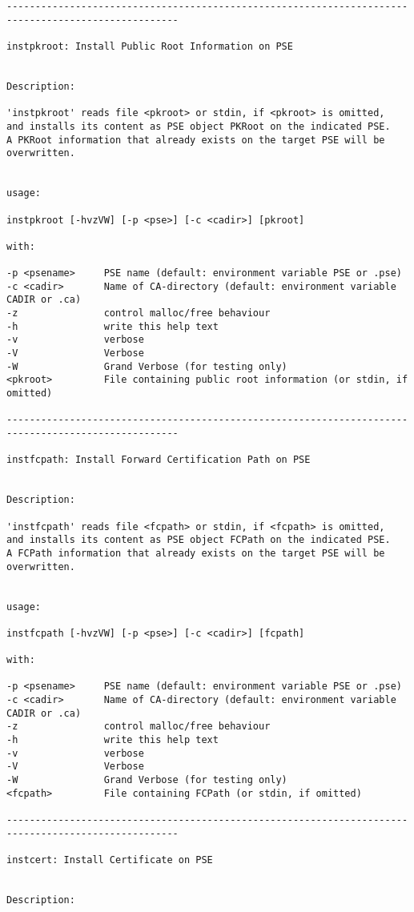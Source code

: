 {\begin{verbatim}
----------------------------------------------------------------------------------------------------

instpkroot: Install Public Root Information on PSE


Description:

'instpkroot' reads file <pkroot> or stdin, if <pkroot> is omitted,
and installs its content as PSE object PKRoot on the indicated PSE.
A PKRoot information that already exists on the target PSE will be overwritten.


usage:

instpkroot [-hvzVW] [-p <pse>] [-c <cadir>] [pkroot]

with:

-p <psename>     PSE name (default: environment variable PSE or .pse)
-c <cadir>       Name of CA-directory (default: environment variable CADIR or .ca)
-z               control malloc/free behaviour
-h               write this help text
-v               verbose
-V               Verbose
-W               Grand Verbose (for testing only)
<pkroot>         File containing public root information (or stdin, if omitted)

----------------------------------------------------------------------------------------------------

instfcpath: Install Forward Certification Path on PSE


Description:

'instfcpath' reads file <fcpath> or stdin, if <fcpath> is omitted,
and installs its content as PSE object FCPath on the indicated PSE.
A FCPath information that already exists on the target PSE will be overwritten.


usage:

instfcpath [-hvzVW] [-p <pse>] [-c <cadir>] [fcpath]

with:

-p <psename>     PSE name (default: environment variable PSE or .pse)
-c <cadir>       Name of CA-directory (default: environment variable CADIR or .ca)
-z               control malloc/free behaviour
-h               write this help text
-v               verbose
-V               Verbose
-W               Grand Verbose (for testing only)
<fcpath>         File containing FCPath (or stdin, if omitted)

----------------------------------------------------------------------------------------------------

instcert: Install Certificate on PSE


Description:


\end{verbatim}}
